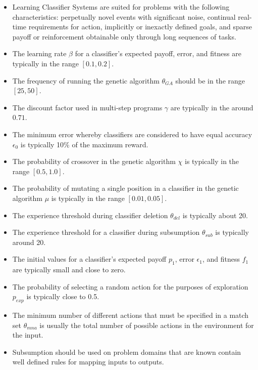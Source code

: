 \begin{itemize}
	\item Learning Classifier Systems are suited for problems with the following characteristics: perpetually novel events with significant noise, continual real-time requirements for action, implicitly or inexactly defined goals, and sparse payoff or reinforcement obtainable only through long sequences of tasks.
	\item The learning rate $\beta$ for a classifier's expected payoff, error, and fitness are typically in the range $[0.1,0.2]$.
	\item The frequency of running the genetic algorithm $\theta_{GA}$ should be in the range $[25,50]$.
	\item The discount factor used in multi-step programs $\gamma$ are typically in the around $0.71$.
	\item The minimum error whereby classifiers are considered to have equal accuracy $\epsilon_{0}$ is typically 10\% of the maximum reward.
	\item The probability of crossover in the genetic algorithm $\chi$ is typically in the range $[0.5,1.0]$.
	\item The probability of mutating a single position in a classifier in the genetic algorithm $\mu$ is typically in the range $[0.01,0.05]$.
	\item The experience threshold during classifier deletion $\theta_{del}$ is typically about 20.
	\item The experience threshold for a classifier during subsumption $\theta_{sub}$ is typically around 20.
	\item The initial values for a classifier's expected payoff $p_1$, error $\epsilon_1$, and fitness $f_1$ are typically small and close to zero.
	\item The probability of selecting a random action for the purposes of exploration $p_{exp}$ is typically close to 0.5.
	\item The minimum number of different actions that must be specified in a match set $\theta_{mna}$ is usually the total number of possible actions in the environment for the input.
	\item Subsumption should be used on problem domains that are known contain well defined rules for mapping inputs to outputs.
\end{itemize}

